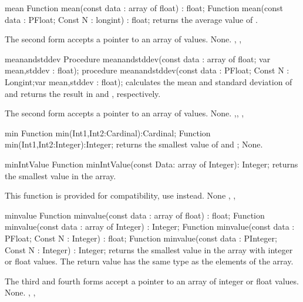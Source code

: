 
\begin{function}{mean}
\Declaration
Function mean(const data : array of float) : float;
Function mean(const data : PFloat; Const N : longint) : float;
\Description
{} returns the average value of .

The second form accepts a pointer to an array of  values.
\Errors
None.
\SeeAlso
{}, , 
\end{function}


\begin{procedure}{meanandstddev}
\Declaration
Procedure meanandstddev(const data : array of float; 
                        var mean,stddev : float);
procedure meanandstddev(const data : PFloat;
  Const N : Longint;var mean,stddev : float);
\Description
{} calculates the mean and standard deviation of 
and returns the result in  and , respectively.

The second form accepts a pointer to an array of  values.
\Errors
None.
\SeeAlso
{},, , 
\end{procedure}



\begin{function}{min}
\Declaration
Function min(Int1,Int2:Cardinal):Cardinal;
Function min(Int1,Int2:Integer):Integer;
\Description
{} returns the smallest value of  and ;
\Errors
None.
\SeeAlso
{}
\end{function}


\begin{function}{minIntValue}
\Declaration
Function minIntValue(const Data: array of Integer): Integer;
\Description
{} returns the smallest value in the  array.

This function is provided for \delphi compatibility, use 
instead.
\Errors
None
\SeeAlso
{}, , 
\end{function}



\begin{function}{minvalue}
\Declaration
Function minvalue(const data : array of float) : float;
Function minvalue(const data : array of Integer) : Integer;
Function minvalue(const data : PFloat; Const N : Integer) : float;
Function minvalue(const data : PInteger; Const N : Integer) : Integer;
\Description
{} returns the smallest value in the  
array with integer or float values. The return value has 
the same type as the elements of the array.

The third and fourth forms accept a pointer to an array of  
integer or float values.
\Errors
None.
\SeeAlso
{}, , 
\end{function}

